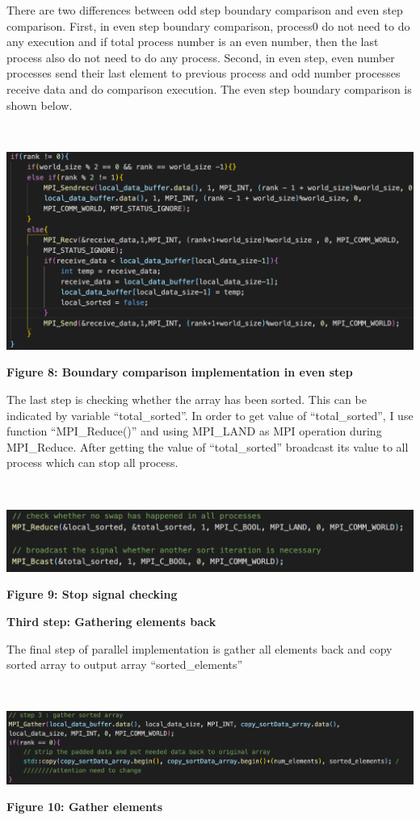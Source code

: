 There are two differences between odd step boundary comparison and even step comparison. First, in even step boundary comparison, process0 do not need to do any execution and if total process number is an even number, then the last process also do not need to do any process. Second, in even step, even number processes send their last element to previous process and odd number processes receive data and do comparison execution. The even step boundary comparison is shown below.

~\\
\centerline {\includegraphics[scale = 1, width=14cm]{para_bo2}}
\centerline{\textbf {Figure 8: Boundary comparison implementation in even step}}

The last step is checking whether the array has been sorted. This can be indicated by variable “total\_sorted”. In order to get value of “total\_sorted”, I use function “MPI\_Reduce()” and using MPI\_LAND as MPI operation during MPI\_Reduce. After getting the value of “total\_sorted” broadcast its value to all process which can stop all process.

~\\
\centerline {\includegraphics[scale = 1, width=14cm]{para_bo3}}
\centerline{\textbf {Figure 9: Stop signal checking}}

\textbf{Third step: Gathering elements back}

The final step of parallel implementation is gather all elements back and copy sorted array to output array “sorted\_elements”

~\\
\centerline {\includegraphics[scale = 1, width=14cm]{para_bo4}}
\centerline{\textbf {Figure 10: Gather elements}}

